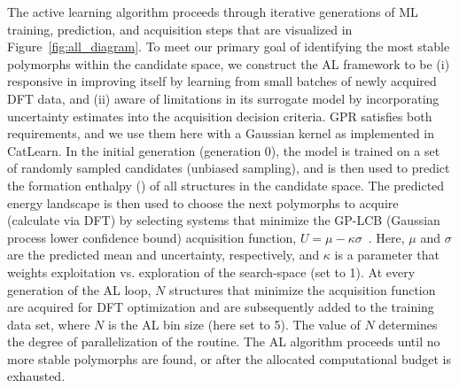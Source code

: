 %
%
The active learning algorithm proceeds through iterative generations of ML training, prediction, and acquisition steps that are visualized in Figure~\ref{fig:all_diagram}.
%
To meet our primary goal of identifying the most stable polymorphs within the candidate space,
we construct the AL framework to be
(i) responsive in improving itself by learning from small batches of newly acquired DFT data,
and (ii) aware of limitations in its surrogate model by incorporating uncertainty estimates into the acquisition decision criteria.
%
GPR satisfies both requirements,
and we use them here with a Gaussian kernel as implemented in CatLearn.
\cite{hansen2019atomistic,CatLearn_Repo}
%
%
In the initial generation (generation 0), the model is trained on a set of randomly sampled candidates (unbiased sampling),
and is then used to predict the formation enthalpy (\DHf) of all structures in the candidate space.
%
The predicted energy landscape is then used to choose the next polymorphs to acquire (calculate via DFT) by selecting systems that minimize the GP-LCB (Gaussian process lower confidence bound) acquisition function,
$U = \mu - \kappa \sigma$~\cite{Cox1992}.
%
Here, $\mu$ and $\sigma$ are the predicted \DHf mean and uncertainty, respectively,
and $\kappa$ is a parameter that weights exploitation vs. exploration of the search-space (set to 1).
%
At every generation of the AL loop, $N$ structures that minimize the acquisition function are acquired for DFT optimization and are subsequently added to the training data set, where $N$ is the AL bin size (here set to 5).
%
The value of $N$ determines the degree of parallelization of the routine.
%
%
%
The AL algorithm proceeds until no more stable polymorphs are found, or after the allocated computational budget is exhausted.


